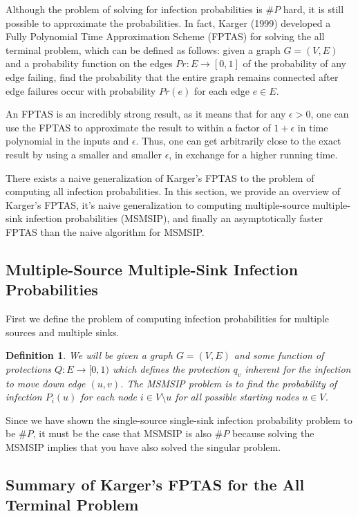 \documentclass{article}
\theoremstyle{plain}
\newtheorem{definition}{Definition}
\begin{document}
Although the problem of solving for infection probabilities is $\# P$ hard, it is still possible to approximate the probabilities. In fact, Karger (1999) developed a Fully Polynomial Time Approximation Scheme (FPTAS) for solving the all terminal problem, which can be defined as follows: given a graph $G = (V,E)$ and a probability function on the edges $Pr: E \to [0,1]$ of the probability of any edge failing, find the probability that the entire graph remains connected after edge failures occur with probability $Pr(e)$ for each edge $e \in E$.

An FPTAS is an incredibly strong result, as it means that for any $\epsilon > 0$, one can use the FPTAS to approximate the result to within a factor of $1 + \epsilon$ in time polynomial in the inputs and $\epsilon$. Thus, one can get arbitrarily close to the exact result by using a smaller and smaller $\epsilon$, in exchange for a higher running time.

There exists a naive generalization of Karger's FPTAS to the problem of computing all infection probabilities. In this section, we provide an overview of Karger's FPTAS, it's naive generalization to computing multiple-source multiple-sink infection probabilities (MSMSIP), and finally an asymptotically faster FPTAS than the naive algorithm for MSMSIP.

\subsection{Multiple-Source Multiple-Sink Infection Probabilities}

First we define the problem of computing infection probabilities for multiple sources and multiple sinks.

\begin{definition}
    We will be given a graph $G = (V,E)$ and some function of protections $Q: E \to [0,1)$ which defines the protection $q_v$ inherent for the infection to move down edge $(u,v)$. The \emph{MSMSIP problem} is to find the probability of infection $P_i(u)$ for each node $i \in V \setminus u$ for all possible starting nodes $u \in V$.
  \end{definition}

  Since we have shown the single-source single-sink infection probability problem to be $\# P$, it must be the case that MSMSIP is also $\# P$ because solving the MSMSIP implies that you have also solved the singular problem.

\subsection{Summary of Karger's FPTAS for the All Terminal Problem}
\end{document}
